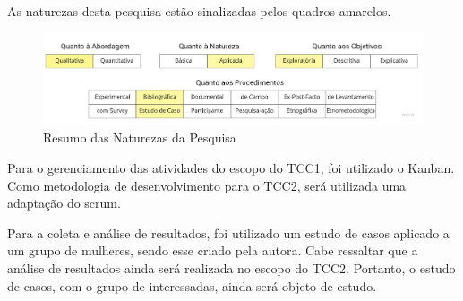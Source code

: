 As naturezas desta pesquisa estão sinalizadas pelos quadros amarelos.

\begin{figure}[h]
	\centering
	\includegraphics[keepaspectratio=true,scale=0.3]{figuras/resumoAbordagem.pdf}
	\caption{Resumo das Naturezas da Pesquisa}
        \label{fig06}
\end{figure}

Para o gerenciamento das atividades do escopo do TCC1, foi utilizado o Kanban. Como metodologia de desenvolvimento para o TCC2, será utilizada uma adaptação do scrum.

Para a coleta e análise de resultados, foi utilizado um estudo 
de casos aplicado a um grupo de mulheres, sendo esse criado pela 
autora. Cabe ressaltar que a análise de resultados ainda será 
realizada no escopo do TCC2. Portanto, o estudo de casos, com o 
grupo de interessadas, ainda será objeto de estudo.



          

